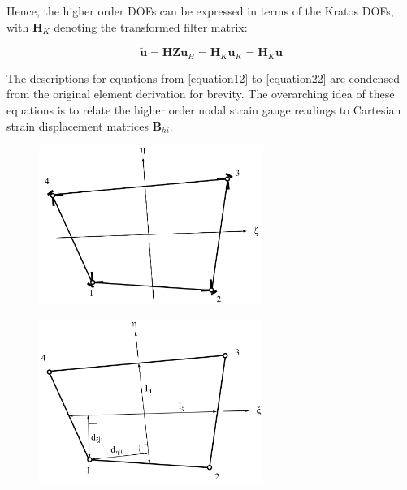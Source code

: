 Hence, the higher order DOFs can be expressed in terms of the Kratos DOFs, with $\mathbf{H}_K$ denoting the transformed filter matrix:

\begin{equation} 
\widetilde{\mathbf{u}} = \mathbf{H Z} \mathbf{u}_H = \mathbf{H}_K \mathbf{u}_K = \mathbf{H}_K \mathbf{u}
\label{equation11_3}
\end{equation}

The descriptions for equations from \eqref{equation12} to \eqref{equation22} are condensed from the original element derivation \cite{Hau94} for brevity. The overarching idea of these equations is to relate the higher order nodal strain gauge readings to Cartesian strain displacement matrices $\mathbf{B}_{hi}$.

\begin{figure}[H]
	\begin{minipage}{.5\textwidth}
		\centering
		\includegraphics[width=7.3cm]
		{images/ANDES_strain_gauges.png}
		\label{fig:andes_gauges}
	\end{minipage}%
	\begin{minipage}{.5\textwidth}
		\centering
		\includegraphics[width=7.3cm]
		{images/andes_geometric_quantities.png}
		\label{fig:andes_dims}
	\end{minipage}
\end{figure}

